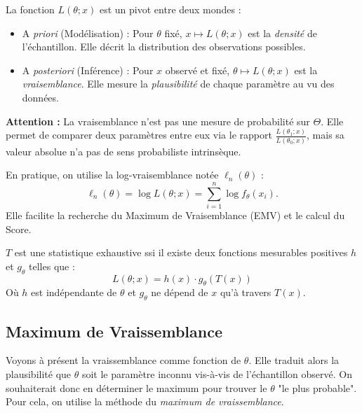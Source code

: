 \begin{remark}
    La fonction $L(\theta; x)$ est un pivot entre deux mondes :
    \begin{itemize}
        \item A \emph{priori} (Modélisation) : Pour $\theta$ fixé, $x \mapsto L(\theta; x)$ est la \emph{densité} de l'échantillon. 
        Elle décrit la distribution des observations possibles.
        \item A \emph{posteriori} (Inférence) : Pour $x$ observé et fixé, $\theta \mapsto L(\theta; x)$ est la 
        \emph{vraisemblance}. Elle mesure la \emph{plausibilité} de chaque paramètre au vu des données. 
    \end{itemize}
    \textbf{Attention :} La vraisemblance n'est pas une mesure de probabilité sur $\Theta$. Elle permet de comparer deux 
    paramètres entre eux via le rapport $\frac{L(\theta_1; x)}{L(\theta_0; x)}$, mais sa valeur absolue n'a pas de sens 
    probabiliste intrinsèque.
\end{remark}

\begin{remark}
    En pratique, on utilise la log-vraisemblance notée $\ell_n(\theta)$ :
        $$ \ell_n(\theta) = \log L(\theta; x) = \sum_{i=1}^n \log f_\theta(x_i). $$
    Elle facilite la recherche du Maximum de Vraisemblance (EMV) et le calcul du Score.
\end{remark}

\begin{theorem}
    $T$ est une statistique exhaustive ssi il existe deux fonctions mesurables positives $h$ et $g_\theta$ telles que :
        $$ \boxed{L(\theta; {x}) = h({x}) \cdot g_\theta(T({x}))} $$
    Où $h$ est indépendante de $\theta$ et $g_\theta$ ne dépend de ${x}$ qu'à travers $T({x})$.
\end{theorem}

\subsection{Maximum de Vraissemblance}

Voyons à présent la vraissemblance comme fonction de $ \theta$. Elle traduit alors la plausibilité 
que $ \theta$ soit le paramètre inconnu vis-à-vis de l'échantillon observé. On souhaiterait donc en déterminer 
le maximum pour trouver le $ \theta$ "le plus probable". Pour cela, on utilise la méthode 
du \emph{maximum de vraissemblance}. 


